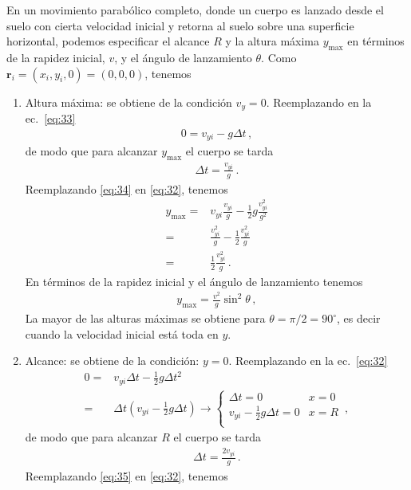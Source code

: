 En un movimiento parabólico completo, donde un cuerpo es lanzado desde
el suelo con cierta velocidad inicial y retorna al suelo sobre una
superficie horizontal, podemos especificar el alcance $R$ y la altura
máxima $y_{\text{max}}$ en términos de la rapidez inicial, $v$, y el
ángulo de lanzamiento $\theta$. Como
$\mathbf{r}_i=(x_i,y_i,0)=(0,0,0)$, tenemos
  \begin{enumerate}
  \item Altura máxima: se obtiene de la condición $v_y=0$. Reemplazando en la ec.~\eqref{eq:33}
    \begin{align}
      0=v_{yi}-g\Delta t\,,
    \end{align}
de modo que para alcanzar $y_{\text{max}}$ el cuerpo se tarda
\begin{align}
  \label{eq:34}
  \Delta t=\frac{v_{yi}}{g}\,.
\end{align}
Reemplazando \eqref{eq:34} en \eqref{eq:32}, tenemos
\begin{align}
  y_{\text{max}}=&v_{yi}\frac{v_{yi}}{g}-\frac{1}{2}g\frac{v_{yi}^2}{g^2}\nonumber\\
  =&\frac{v_{yi}^2}{g}-\frac{1}{2}\frac{v_{yi}^2}{g}\nonumber\\
  =&\frac{1}{2}\frac{v_{yi}^2}{g}\,.
\end{align}
En términos de la rapidez inicial y el ángulo de lanzamiento tenemos
\begin{align}
  y_{\text{max}}=\frac{v^2}{g}\sin^2\theta\,,
\end{align}
La mayor de las alturas máximas se obtiene para $\theta=\pi/2=90^\circ$, es decir cuando la velocidad inicial está toda en $y$.
\item Alcance: se obtiene de la condición: $y=0$. Reemplazando en la ec.~\eqref{eq:32}
  \begin{align}
    0=&v_{yi}\Delta t-\frac{1}{2}g\Delta t^2\nonumber\\
    =&\Delta t(v_{yi}-\frac{1}{2}g\Delta t)\to
    \begin{cases}
      \Delta t=0 & x=0\\
      v_{yi}-\frac{1}{2}g\Delta t=0 & x=R\\
    \end{cases}
\,,
  \end{align}
de modo que para alcanzar $R$ el cuerpo se tarda
\begin{align}
 \label{eq:35}
  \Delta t=\frac{2v_{yi}}{g}\,.
\end{align}
Reemplazando \eqref{eq:35} en \eqref{eq:32}, tenemos
\begin{align}

\end{align}
\end{enumerate}
